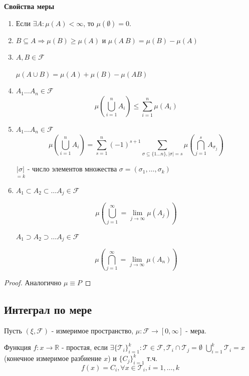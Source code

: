 \textbf{Свойства меры}
\begin{enumerate}
	\item Если $\exists A: \mu(A) < \infty$, то $\mu(\emptyset) = 0$.
	\item $B \subseteq A \Rightarrow \mu(B) \ge \mu(A)$ и $\mu(A \ B) = \mu(B) - \mu(A)$
	\item $A, B \in \mathcal{F}$
	
	$\mu(A \cup B) = \mu(A) + \mu(B) - \mu(AB)$
	\item $A_1 \dots A_n \in \mathcal{F}$
	\[ \mu \left( \bigcup_{i=1}^n A_i \right) \le \sum_{i=1}^{n} \mu (A_i) \]
	\item $A_1 \dots A_n \in \mathcal{F}$
	\[ \mu \left( \bigcup_{i=1}^n A_i \right) = \sum_{s=1}^{n}(-1)^{s+1} \sum_{\sigma \subseteq \{1 \dots n\}, |\sigma|=s} \mu \left( \bigcap_{j=1}^s A_{\sigma_j} \right) \]
	\begin{remark}
		$\underset{=k}{|\sigma|}$ - число элементов множества $\sigma = (\sigma_1, \dots, \sigma_k)$
	\end{remark}
	\item $A_1 \subset A_2 \subset \dots A_j \in \mathcal{F}$
	
	\[ \mu \left( \bigcup_{j=1}^{\infty} = \lim_{j \to \infty} \mu(A_j) \right) \]
	
	$A_1 \supset A_2 \supset \dots A_j \in \mathcal{F}$
	
	\[ \mu \left( \bigcap_{j=1}^{\infty} = \lim_{j \to \infty} \mu(A_n) \right) \]
\end{enumerate}
\begin{proof}
	Аналогично $\mu \equiv P$
\end{proof}

\subsection{Интеграл по мере}

Пусть $(\xi, \mathcal{F})$ - измеримое пространство, $\mu : \mathcal{F} \to [0, \infty]$ - мера.

\begin{definition}
	Функция $f: x \to \mathbb{R}$ - простая, если $\exists \{ \mathcal{T}_i \}_{i=1}^k: \mathcal{T} \in \mathcal{F}, \mathcal{T}_i \cap \mathcal{T}_j = \emptyset$
	$\bigcup_{i=1}^k \mathcal{T}_i = x$ (конечное измеримое разбиение $x$) и $\{ C_j \}_{i=1}^k$ т.ч.
	\[ f(x) = C_i, \forall x \in \mathcal{T}_i, i = 1, \dots, k \]
\end{definition}

